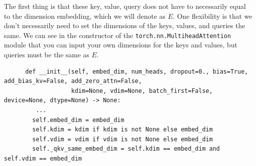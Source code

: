     The first thing is that these key, value, query does not have to necessarily equal to the dimension embedding, which we will denote as $E$. One flexibility is that we don't necessarily need to set the dimensions of the keys, values, and queries the same. We can see in the constructor of the \texttt{torch.nn.MultiheadAttention} module that you can input your own dimensions for the keys and values, but queries must be the same as $E$. 
    \begin{lstlisting}
      def __init__(self, embed_dim, num_heads, dropout=0., bias=True, add_bias_kv=False, add_zero_attn=False,
                   kdim=None, vdim=None, batch_first=False, device=None, dtype=None) -> None:
         ... 
        self.embed_dim = embed_dim
        self.kdim = kdim if kdim is not None else embed_dim
        self.vdim = vdim if vdim is not None else embed_dim
        self._qkv_same_embed_dim = self.kdim == embed_dim and self.vdim == embed_dim
    \end{lstlisting}

